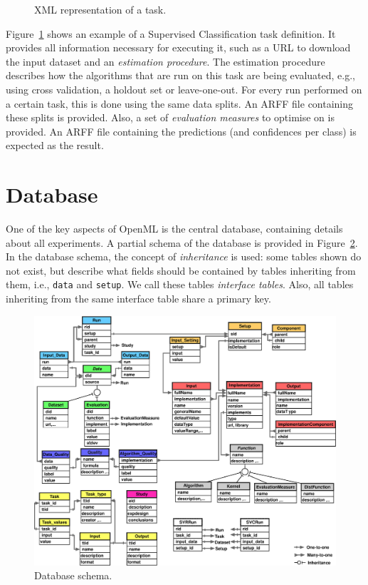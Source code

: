 \documentclass[10pt, twoside]{article}
\begin{document}
\begin{figure}[ht!]
	
	\caption{XML representation of a task.}
	\label{fig:taskxml}
\end{figure} 

Figure~\ref{fig:taskxml} shows an example of a Supervised Classification task definition. It provides all information necessary for executing it, such as a URL to download the input dataset and an \emph{estimation procedure}. The estimation procedure describes how the algorithms that are run on this task are being evaluated, e.g., using cross validation, a holdout set or leave-one-out. For every run performed on a certain task, this is done using the same data splits. An ARFF file containing these splits is provided. Also, a set of \emph{evaluation measures} to optimise on is provided. An ARFF file containing the predictions (and confidences per class) is expected as the result.

\section{Database}
\label{sec:Database}
One of the key aspects of OpenML is the central database, containing details about all experiments. A partial schema of the database is provided in Figure~\ref{fig:dbschema}. 
In the database schema, the concept of \emph{inheritance} is used: some tables shown do not exist, but describe what fields should be contained by tables inheriting from them, i.e., \texttt{data} and \texttt{setup}. We call these tables \emph{interface tables}. Also, all tables inheriting from the same interface table share a primary key. 

\begin{figure}[ht!]
	\centering
	\includegraphics[width=\textwidth]{eps/dbschema.eps}
	\caption{Database schema.}
	\label{fig:dbschema}
\end{figure} 
\end{document}
